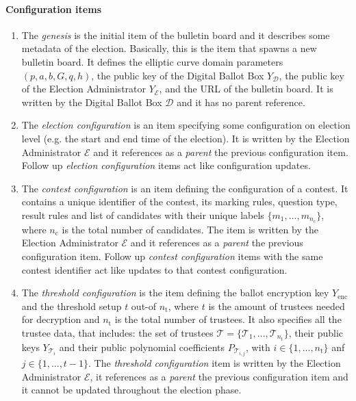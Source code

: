 \paragraph{Configuration items}
\begin{enumerate}
    \item The \textit{genesis} is the initial item of the bulletin board and it describes some metadata of the election. Basically, this is the item that spawns a new bulletin board. It defines the elliptic curve domain parameters $(p, a, b, G, q, h)$, the public key of the Digital Ballot Box $Y_\mathcal{D}$, the public key of the Election Administrator $Y_\mathcal{E}$, and the URL of the bulletin board. It is written by the Digital Ballot Box $\mathcal{D}$ and it has no parent reference.
    
    \item The \textit{election configuration} is an item specifying some configuration on election level (e.g. the start and end time of the election). It is written by the Election Administrator $\mathcal{E}$ and it references as a \textit{parent} the previous configuration item. Follow up \textit{election configuration} items act like configuration updates.
    
    \item The \textit{contest configuration} is an item defining the configuration of a contest. It contains a unique identifier of the contest, its marking rules, question type, result rules and list of candidates with their unique labels $\{m_1, ..., m_{n_\mathrm{c}}\}$, where $n_\mathrm{c}$ is the total number of candidates. The item is written by the Election Administrator $\mathcal{E}$ and it references as a \textit{parent} the previous configuration item. Follow up \textit{contest configuration} items with the same contest identifier act like updates to that contest configuration.
    
    \item The \textit{threshold configuration} is the item defining the ballot encryption key $Y_\mathrm{enc}$ and the threshold setup $t$ out-of $n_\mathrm{t}$, where $t$ is the amount of trustees needed for decryption and $n_\mathrm{t}$ is the total number of trustees. It also specifies all the trustee data, that includes: the set of trustees $\boldsymbol{\mathcal{T}} = \{\mathcal{T}_1, ..., \mathcal{T}_{n_\mathrm{t}}\}$, their public keys $Y_{\mathcal{T}_i}$ and their public polynomial coefficients $P_{\mathcal{T}_{i,j}}$, with $i \in \{1, ..., n_\mathrm{t}\}$ anf $j \in \{1, ..., t-1\}$. The \textit{threshold configuration} item is written by the Election Administrator $\mathcal{E}$, it references as a \textit{parent} the previous configuration item and it cannot be updated throughout the election phase.
    

\end{enumerate}
